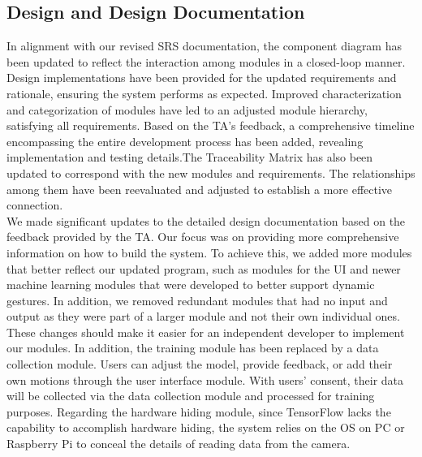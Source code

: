 \documentclass[12pt, titlepage]{article}
\begin{document}
\subsection{Design and Design Documentation}
In alignment with our revised SRS documentation, the component diagram has been updated to reflect the interaction among modules in a closed-loop manner. Design implementations have been provided for the updated requirements and rationale, ensuring the system performs as expected. Improved characterization and categorization of modules have led to an adjusted module hierarchy, satisfying all requirements. Based on the TA's feedback, a comprehensive timeline encompassing the entire development process has been added, revealing implementation and testing details.The Traceability Matrix has also been updated to correspond with the new modules and requirements. The relationships among them have been reevaluated and adjusted to establish a more effective connection.\\

\noindent We made significant updates to the detailed design documentation based on the feedback provided by the TA. Our focus was on providing more comprehensive information on how to build the system. To achieve this, we added more modules that better reflect our updated program, such as modules for the UI and newer machine learning modules that were developed to better support dynamic gestures. In addition, we removed redundant modules that had no input and output as they were part of a larger module and not their own individual ones. These changes should make it easier for an independent developer to implement our modules. In addition, the training module has been replaced by a data collection module. Users can adjust the model, provide feedback, or add their own motions through the user interface module. With users' consent, their data will be collected via the data collection module and processed for training purposes. Regarding the hardware hiding module, since TensorFlow lacks the capability to accomplish hardware hiding, the system relies on the OS on PC or Raspberry Pi to conceal the details of reading data from the camera.\\
\end{document}

